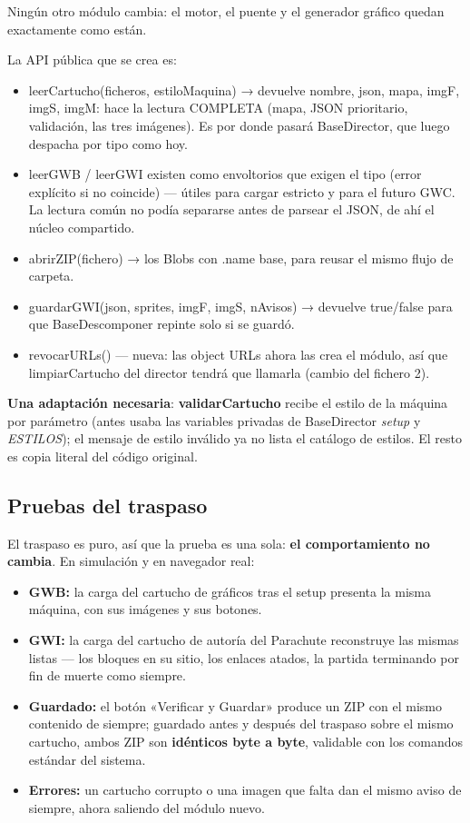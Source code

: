 Ningún otro módulo cambia: el motor, el puente y el generador
gráfico quedan exactamente como están.

La API pública que se crea es:
\begin{itemize}
	\item leerCartucho(ficheros, estiloMaquina) → devuelve {nombre, json, mapa, imgF, imgS, imgM}: hace la lectura COMPLETA (mapa, JSON prioritario, validación, las tres imágenes). Es por donde pasará BaseDirector, que luego despacha por tipo como hoy.
	\item leerGWB / leerGWI existen como envoltorios que exigen el tipo (error explícito si no coincide) — útiles para cargar estricto y para el futuro GWC. La lectura común no podía separarse antes de parsear el JSON, de ahí el núcleo compartido.
	\item abrirZIP(fichero) → los Blobs con .name base, para reusar el mismo flujo de carpeta.
	\item guardarGWI(json, sprites, imgF, imgS, nAvisos) → devuelve true/false para que BaseDescomponer repinte solo si se guardó.
	\item revocarURLs() — nueva: las object URLs ahora las crea el módulo, así que limpiarCartucho del director tendrá que llamarla (cambio del fichero 2).
\end{itemize}

\textbf{Una adaptación necesaria}: \textbf{validarCartucho} recibe el estilo de la máquina por parámetro (antes usaba las variables privadas de BaseDirector \emph{setup} y \emph{ESTILOS}); el mensaje de estilo inválido ya no lista el catálogo de estilos. El resto es copia literal del código original.

\subsection{Pruebas del traspaso}
\label{sec:F5I4Pruebas}

El traspaso es puro, así que la prueba es una sola: \textbf{el
	comportamiento no cambia}. En simulación y en navegador real:

\begin{itemize}
	\item \textbf{GWB:} la carga del cartucho de gráficos tras el
	setup presenta la misma máquina, con sus imágenes y sus botones.
	\item \textbf{GWI:} la carga del cartucho de autoría del
	Parachute reconstruye las mismas listas — los bloques en su
	sitio, los enlaces atados, la partida terminando por fin de
	muerte como siempre.
	\item \textbf{Guardado:} el botón «Verificar y Guardar» produce
	un ZIP con el mismo contenido de siempre; guardado antes y
	después del traspaso sobre el mismo cartucho, ambos ZIP son
	\textbf{idénticos byte a byte}, validable con los comandos
	estándar del sistema.
	\item \textbf{Errores:} un cartucho corrupto o una imagen que
	falta dan el mismo aviso de siempre, ahora saliendo del módulo
	nuevo.
\end{itemize}
